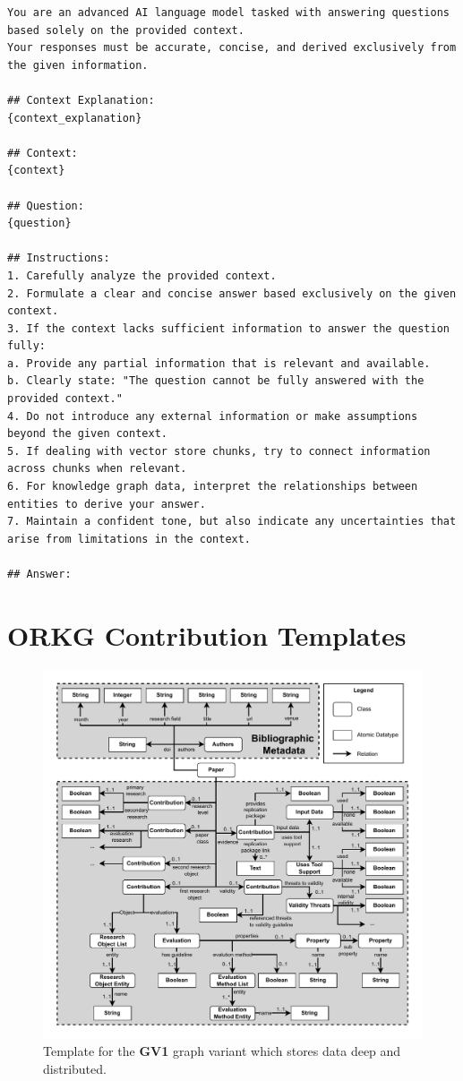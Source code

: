 \begin{lstlisting}[caption={Answer Generation Prompt},label={lst:answer_generation_prompt}]
You are an advanced AI language model tasked with answering questions based solely on the provided context.
Your responses must be accurate, concise, and derived exclusively from the given information.

## Context Explanation:
{context_explanation}

## Context:
{context}

## Question:
{question}

## Instructions:
1. Carefully analyze the provided context.
2. Formulate a clear and concise answer based exclusively on the given context.
3. If the context lacks sufficient information to answer the question fully:
a. Provide any partial information that is relevant and available.
b. Clearly state: "The question cannot be fully answered with the provided context."
4. Do not introduce any external information or make assumptions beyond the given context.
5. If dealing with vector store chunks, try to connect information across chunks when relevant.
6. For knowledge graph data, interpret the relationships between entities to derive your answer.
7. Maintain a confident tone, but also indicate any uncertainties that arise from limitations in the context.

## Answer:
\end{lstlisting}

\section{ORKG Contribution Templates}
\label{sec:appendix:orkg_contribution_templates}

\begin{figure}[H]
    \centering
    \includegraphics[width=0.90\linewidth]{figures/orkg/template_overview-deep_distributed.drawio.pdf}
    \caption[Template for First Graph Variant]{Template for the \textbf{GV1} graph variant which stores data deep and distributed.}
\end{figure}

